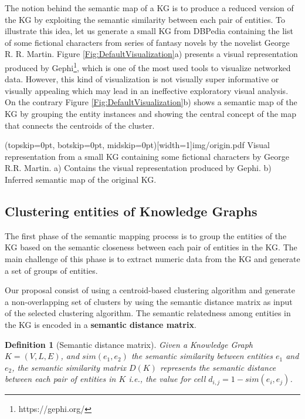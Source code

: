 \documentclass{ieeeaccess}
\newtheorem{Definition}{Definition}
\begin{document}
The notion behind the semantic map of a KG is to produce 
a reduced version of the KG by exploiting the semantic 
similarity between each pair of entities. To illustrate 
this idea, let us generate a small KG from DBPedia containing 
the list of some fictional characters from series of fantasy novels 
by the novelist George R. R. Martin. Figure \ref{Fig:DefaultVisualization}a) 
presents a visual representation produced by Gephi\footnote{https://gephi.org/}, 
which is one of the most used tools to visualize networked data. However, 
this kind of visualization is not visually super informative 
or visually appealing which may lead in an ineffective
exploratory visual analysis. On the contrary Figure \ref{Fig:DefaultVisualization}b)
shows a semantic map of the KG by grouping the entity instances
and showing the central concept of the map that connects the centroids of
the cluster.

\Figure[h!](topskip=0pt, botskip=0pt, midskip=0pt)[width=1\textwidth]{img/origin.pdf}
{Visual representation from a small KG containing some fictional characters by George R.R. Martin. a) Contains the visual representation produced by Gephi. b) Inferred semantic map of the original KG.\label{Fig:DefaultVisualization}}

\subsection{Clustering entities of Knowledge Graphs}

The first phase of the semantic mapping process is to group 
the entities of the KG based on the semantic closeness between
each pair of entities in the KG. The main challenge of this
phase is to extract numeric data from the KG and generate a set of
groups of entities. 

Our proposal consist of using a centroid-based clustering algorithm
and generate a non-overlapping set of clusters by using the 
semantic distance matrix as input of the selected clustering algorithm. The semantic relatedness among entities in 
the KG is encoded in a \textbf{semantic distance matrix}.

\begin{Definition}[Semantic distance matrix]
Given a Knowledge Graph $K = (V, L, E)$, and $sim(e_{1}, 
e_{2})$ the semantic similarity between entities $e_{1}$ 
and $e_{2}$, the semantic similarity matrix $D(K)$ represents 
the semantic distance between each pair of entities in $K$ i.e., 
the value for cell  $d_{i,j} = 1 - sim(e_{i}, e_{j})$.
\end{Definition}
\end{document}
